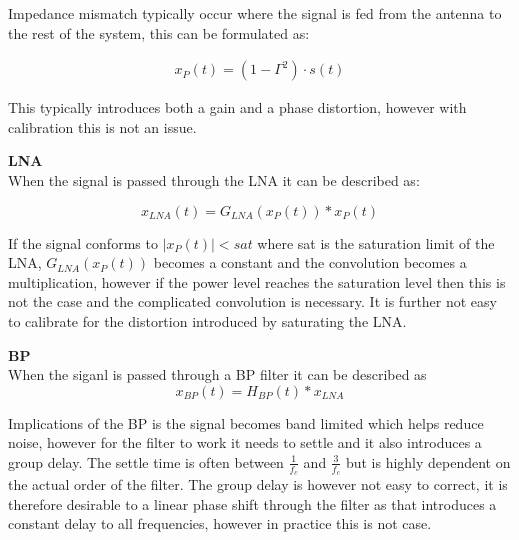 Impedance mismatch typically occur where the signal is fed from the antenna to the rest of the system, this can be formulated as:

\begin{align}
x_P(t) = (1-\Gamma^2)\cdot s(t) \label{eq:ref_power}
\end{align}
\begin{where}
\end{where}

This typically introduces both a gain and a phase distortion, however with calibration this is not an issue.

\textbf{\Gls{LNA}}\\
When the signal is passed through the LNA it can be described as:

\begin{equation}
x_{LNA}(t) = G_{LNA}\left(x_P(t)\right)*x_P(t)
\end{equation}
\begin{where}
\end{where}

If the signal conforms to $|x_P(t)| < sat$ where sat is the saturation limit of the LNA, $G_{LNA}\left(x_P(t)\right)$ becomes a constant and the convolution becomes a multiplication, however if the power level reaches the saturation level then this is not the case and the complicated convolution is necessary. It is further not easy to calibrate for the distortion introduced by saturating the LNA.

\textbf{\Gls{BP}}\\
When the siganl is passed through a BP filter it can be described as
\begin{equation}
x_{BP}(t) = H_{BP}(t)*x_{LNA}
\end{equation}
\begin{where}
\end{where}

Implications of the BP is the signal becomes band limited which helps reduce noise, however for the filter to work it needs to settle and it also introduces a group delay. The settle time is often between $\frac{1}{f_c}$ and $\frac{3}{f_c}$%
but is highly dependent on the actual order of the filter. The group delay is however not easy to correct, it is therefore desirable to a linear phase shift through the filter as that introduces a constant delay to all frequencies, however in practice this is not case. 


